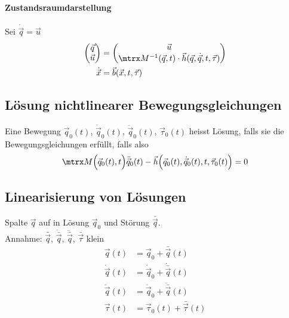 		\paragraph{Zustandsraumdarstellung} %
			Sei $\dot{\vec q} = \vec u$
			\begin{align*}
				\begin{pmatrix}
					\vec q \\ \vec u
				\end{pmatrix} &= 
				\begin{pmatrix}
					\vec u \\ \mtrx M^{-1}(\vec q, t) \cdot \vec h(\vec q, \dot{\vec q}, t, \vec \tau)
				\end{pmatrix} \\
				\dot{\vec x} &= \vec b(\vec x, t, \vec \tau)
			\end{align*}
	
	\subsection{Lösung nichtlinearer Bewegungsgleichungen} %
		\begin{definition}
			Eine Bewegung $\vec q_0(t)$, $\dot{\vec q}_0(t)$, $\ddot{\vec q}_0(t)$, $\vec\tau_0(t)$ heisst Lösung, falls sie die Bewegungsgleichungen erfüllt, falls also
			\[
				\mtrx M\Big(\vec q_0(t), t\Big) \ddot{\vec q}_0(t) - \vec h\Big(\vec q_0(t),\dot{\vec q}_0(t), t, \vec\tau_0(t)\Big) = 0
			\]
		\end{definition}
	
	\subsection{Linearisierung von Lösungen} %
		Spalte $\vec q$ auf in Lösung $\vec q_0$ und Störung $\bar{\vec q}$. \\
		Annahme: $\bar{\vec q}$, $\dot{\bar{\vec q}}$, $\ddot{\bar{\vec q}}$, $\bar{\vec\tau}$ klein
		\begin{align*}
			\vec q(t) &= \vec q_0 + \bar{\vec q}(t) \\
			\dot{\vec q}(t) &= \dot{\vec q}_0 + \dot{\bar{\vec q}}(t) \\
			\ddot{\vec q}(t) &= \ddot{\vec q}_0 + \ddot{\bar{\vec q}}(t) \\
			\vec \tau(t) &= \vec \tau_0(t) + \bar{\vec \tau}(t)
		\end{align*}
		

